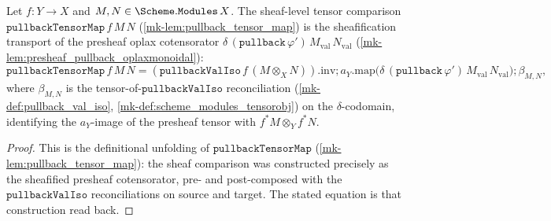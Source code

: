 \begin{lemma}\label{mk-lem:pullback_tensor_map_eq_sheafify_delta}
  \leanok

  Let \(f : Y \to X\) and \(M, N \in \Scheme.\mathtt{Modules}\,X\). The sheaf-level tensor comparison
  \(\mathtt{pullbackTensorMap}\,f\,M\,N\) (\ref{mk-lem:pullback_tensor_map}) is the sheafification
  transport of the presheaf oplax cotensorator
  \(\delta\,(\mathtt{pullback}\,\varphi')\,M_{\mathrm{val}}\,N_{\mathrm{val}}\)
  (\ref{mk-lem:presheaf_pullback_oplaxmonoidal}):
  \[
    \mathtt{pullbackTensorMap}\,f\,M\,N
      = (\mathtt{pullbackValIso}\,f\,(M \otimes_X N)).\mathrm{inv}
        \mathbin{;} a_Y.\mathrm{map}\bigl(\delta\,(\mathtt{pullback}\,\varphi')\,M_{\mathrm{val}}\,N_{\mathrm{val}}\bigr)
        \mathbin{;} \beta_{M,N},
  \]
  where \(\beta_{M,N}\) is the tensor-of-\(\mathtt{pullbackValIso}\) reconciliation
  (\ref{mk-def:pullback_val_iso}, \ref{mk-def:scheme_modules_tensorobj}) on the \(\delta\)-codomain,
  identifying the \(a_Y\)-image of the presheaf tensor with \(f^{*}M \otimes_Y f^{*}N\).
\end{lemma}
\begin{proof}
  \leanok
  This is the definitional unfolding of \(\mathtt{pullbackTensorMap}\) (\ref{mk-lem:pullback_tensor_map}):
  the sheaf comparison was constructed precisely as the sheafified presheaf cotensorator, pre- and
  post-composed with the \(\mathtt{pullbackValIso}\) reconciliations on source and target. The stated
  equation is that construction read back.
\end{proof}

